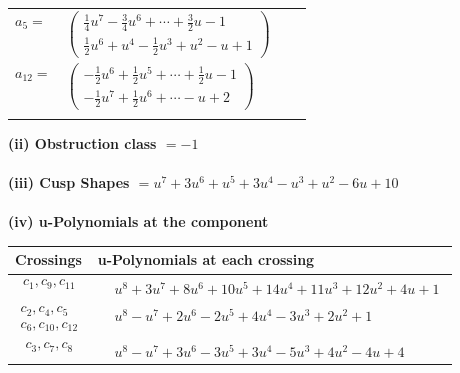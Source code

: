 \documentclass[1p]{elsarticle_modified}
\theoremstyle{definition}
\begin{document}
\begin{tabular}{m{7pt} m{180pt} m{7pt} m{180pt} }
\flushright $a_{5}=$&$\begin{pmatrix}\frac{1}{4} u^7-\frac{3}{4} u^6+\cdots+\frac{3}{2} u-1\\\frac{1}{2} u^6+u^4-\frac{1}{2} u^3+u^2- u+1\end{pmatrix}$ \\
\flushright $a_{12}=$&$\begin{pmatrix}-\frac{1}{2} u^6+\frac{1}{2} u^5+\cdots+\frac{1}{2} u-1\\-\frac{1}{2} u^7+\frac{1}{2} u^6+\cdots- u+2\end{pmatrix}$\\&\end{tabular}
\flushleft \textbf{(ii) Obstruction class $= -1$}\\~\\
\flushleft \textbf{(iii) Cusp Shapes $= u^7+3 u^6+u^5+3 u^4- u^3+u^2-6 u+10$}\\~\\
\newpage\renewcommand{\arraystretch}{1}
\flushleft \textbf{(iv) u-Polynomials at the component}\newline \\
\begin{tabular}{m{50pt}|m{274pt}}
Crossings & \hspace{64pt}u-Polynomials at each crossing \\
\hline $$\begin{aligned}c_{1},c_{9},c_{11}\end{aligned}$$&$\begin{aligned}
&u^8+3 u^7+8 u^6+10 u^5+14 u^4+11 u^3+12 u^2+4 u+1
\end{aligned}$\\
\hline $$\begin{aligned}c_{2},c_{4},c_{5}\\c_{6},c_{10},c_{12}\end{aligned}$$&$\begin{aligned}
&u^8- u^7+2 u^6-2 u^5+4 u^4-3 u^3+2 u^2+1
\end{aligned}$\\
\hline $$\begin{aligned}c_{3},c_{7},c_{8}\end{aligned}$$&$\begin{aligned}
&u^8- u^7+3 u^6-3 u^5+3 u^4-5 u^3+4 u^2-4 u+4
\end{aligned}$\\
\hline
\end{tabular}\\~\\
\end{document}
